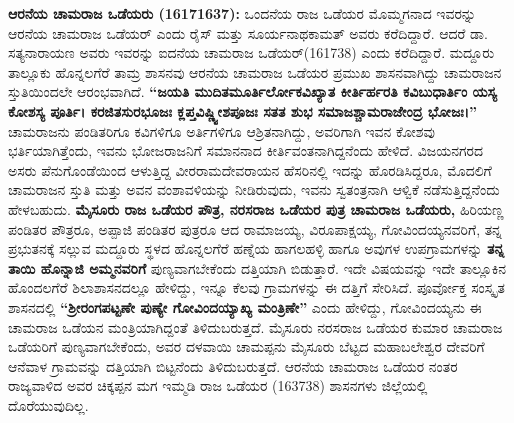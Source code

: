 \textbf{ ಆರನೆಯ ಚಾಮರಾಜ ಒಡೆಯರು (1617\general{\enginline{-}}1637): } ಒಂದನೆಯ ರಾಜ ಒಡೆಯರ ಮೊಮ್ಮಗನಾದ ಇವರನ್ನು ಆರನೆಯ ಚಾಮರಾಜ ಒಡೆಯರ್​ ಎಂದು ರೈಸ್​ ಮತ್ತು ಸೂರ್ಯನಾಥಕಾಮತ್​ ಅವರು ಕರೆದಿದ್ದಾರೆ. ಆದರೆ ಡಾ. ಸತ್ಯನಾರಾಯಣ ಅವರು ಇವರನ್ನು ಐದನೆಯ ಚಾಮರಾಜ ಒಡೆಯರ್​(1617\enginline{-}38) ಎಂದು ಕರೆದಿದ್ದಾರೆ. ಮದ್ದೂರು ತಾಲ್ಲೂಕು ಹೊನ್ನಲಗೆರೆ ತಾಮ್ರ ಶಾಸನವು ಆರನೆಯ ಚಾಮರಾಜ ಒಡೆಯರ ಪ್ರಮುಖ ಶಾಸನವಾಗಿದ್ದು ಚಾಮರಾಜನ ಸ್ತುತಿಯಿಂದಲೇ ಆರಂಭವಾಗಿದೆ. \textbf{“ಜಯತಿ ಮುದಿತಮೂರ್ತಿರ್ಲೋಕವಿಖ್ಯಾತ ಕೀರ್ತಿರ್ಹರತಿ ಕವಿಬುಧಾರ್ತಿಂ ಯಸ್ಯ ಕೋಶಸ್ಯ ಪೂರ್ತಿ। ಕರಜಿತಸುರಭೂಜಃ ಕ್ಲಪ್ತವಿಷ್ಣ್ವೀಶಪೂಜಃ ಸತತ ಶುಭ ಸಮಾಜಶ್ಚಾಮರಾಜೇಂದ್ರ ಭೋಜಃ।”} ಚಾಮರಾಜನು ಪಂಡಿತರಿಗೂ ಕವಿಗಳಿಗೂ ಅರ್ತಿಗಳಿಗೂ ಆಶ್ರಿತನಾಗಿದ್ದು, ಅವರಿಗಾಗಿ ಇವನ ಕೋಶವು ಭರ್ತಿಯಾಗಿತ್ತೆಂದು, ಇವನು ಭೋಜರಾಜನಿಗೆ ಸಮಾನನಾದ ಕೀರ್ತಿವಂತನಾಗಿದ್ದನೆಂದು ಹೇಳಿದೆ. ವಿಜಯನಗರದ ಅಸರು ಪೆನುಗೊಂಡೆಯಿಂದ ಆಳುತ್ತಿದ್ದ ವೀರರಾಮದೇವರಾಯನ ಹೆಸರಿನಲ್ಲಿ ಇದನ್ನು ಹೊರಡಿಸಿದ್ದರೂ, ಮೊದಲಿಗೆ ಚಾಮರಾಜನ ಸ್ತುತಿ ಮತ್ತು ಅವನ ವಂಶಾವಳಿಯನ್ನು ನೀಡಿರುವುದು, ಇವನು ಸ್ವತಂತ್ರನಾಗಿ ಆಳ್ವಿಕೆ ನಡೆಸುತ್ತಿದ್ದನೆಂದು ಹೇಳಬಹುದು. \textbf{ಮೈಸೂರು ರಾಜ ಒಡೆಯರ ಪೌತ್ರ, ನರಸರಾಜ ಒಡೆಯರ ಪುತ್ರ ಚಾಮರಾಜ ಒಡೆಯರು,} ಹಿರಿಯಣ್ಣ ಪಂಡಿತರ ಪೌತ್ರರೂ, ಅಪ್ಪಾಜಿ ಪಂಡಿತರ ಪುತ್ರರೂ ಆದ ರಾಮಾಜಯ್ಯ, ವಿರೂಪಾಕ್ಷಯ್ಯ, ಗೋವಿಂದಯ್ಯನವರಿಗೆ, ತನ್ನ ಪ್ರಭುತನಕ್ಕೆ ಸಲ್ಲುವ ಮದ್ದೂರು ಸ್ಥಳದ ಹೊನ್ನಲಗೆರೆ ಹಣ್ನೆಯ ಹಾಗಲಹಳ್ಳಿ ಹಾಗೂ ಅವುಗಳ ಉಪಗ್ರಾಮಗಳನ್ನು \textbf{ತನ್ನ ತಾಯಿ ಹೊನ್ನಾಜಿ ಅಮ್ಮನವರಿಗೆ} ಪುಣ್ಯವಾಗಬೇಕೆಂದು ದತ್ತಿಯಾಗಿ ಬಿಡುತ್ತಾರೆ. ಇದೇ ವಿಷಯವನ್ನು ಇದೇ ತಾಲ್ಲೂಕಿನ ಹೊಂದಲಗೆರೆ ಶಿಲಾಶಾಸನದಲ್ಲೂ ಹೇಳಿದ್ದು, ಇನ್ನೂ ಕೆಲವು ಗ್ರಾಮಗಳನ್ನು ಈ ದತ್ತಿಗೆ ಸೇರಿಸಿದೆ. ಪೂರ್ವೋಕ್ತ ಸಂಸ್ಕೃತ ಶಾಸನದಲ್ಲಿ \textbf{“ಶ‍್ರೀರಂಗಪಟ್ಟಣೇ ಪುಣ್ಯೇ ಗೋವಿಂದಯ್ಯಾಖ್ಯ ಮಂತ್ರಿಣೇ”} ಎಂದು ಹೇಳಿದ್ದು, ಗೋವಿಂದಯ್ಯನು ಈ ಚಾಮರಾಜ ಒಡೆಯನ ಮಂತ್ರಿಯಾಗಿದ್ದಂತೆ ತಿಳಿದುಬರುತ್ತದೆ. ಮೈಸೂರು ನರಸರಾಜ ಒಡೆಯರ ಕುಮಾರ ಚಾಮರಾಜ ಒಡೆಯರಿಗೆ ಪುಣ್ಯವಾಗಬೇಕೆಂದು, ಅವರ ದಳವಾಯಿ ಚಾಮಪ್ಪನು ಮೈಸೂರು ಬೆಟ್ಟದ ಮಹಾಬಲೇಶ್ವರ ದೇವರಿಗೆ ಆನೆವಾಳ ಗ್ರಾಮವನ್ನು ದತ್ತಿಯಾಗಿ ಬಿಟ್ಟನೆಂದು ತಿಳಿದುಬರುತ್ತದೆ. ಆರನೆಯ ಚಾಮರಾಜ ಒಡೆಯರ ನಂತರ ರಾಜ್ಯವಾಳಿದ ಅವರ ಚಿಕ್ಕಪ್ಪನ ಮಗ ಇಮ್ಮಡಿ ರಾಜ ಒಡೆಯರ (1637\enginline{-}38) ಶಾಸನಗಳು ಜಿಲ್ಲೆಯಲ್ಲಿ ದೊರೆಯುವುದಿಲ್ಲ.

\newpage

